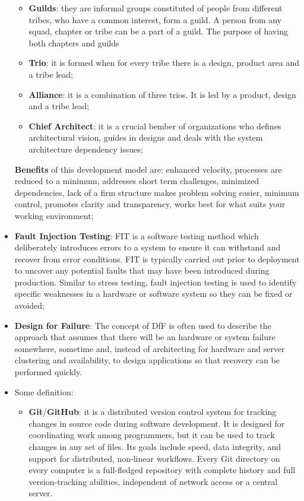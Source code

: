 \documentclass[oneside]{article}
\begin{document}
\begin{itemize}
\begin{itemize}
            \item \textbf{Guilds}: they are informal groups constituted of people from different tribes, who have a common interest, form a guild. A person from any squad, chapter or tribe can be a part of a guild. The purpose of having both chapters and guilds
            
            \item \textbf{Trio}: it is formed when for every tribe there is a design, product area and a tribe lead;
            
            \item \textbf{Alliance}: it is a combination of three trios. It is led by a product, design and a tribe lead;
            
            \item \textbf{Chief Architect}: it is a crucial bember of organizations who defines architectural vision, guides in designs and deals with the system architecture dependency issues;
    \end{itemize}
    
    \textbf{Benefits} of this development model are: enhanced velocity, processes are reduced to a minimum, addresses short term challenges, minimized dependencies, lack of a firm structure makes problem solving easier, minimum control, promotes clarity and transparency, works best for what suits your working environment;
    
    \item \textbf{Fault Injection Testing}: FIT is a software testing method which deliberately introduces errors to a system to ensure it can withstand and recover from error conditions. FIT is typically carried out prior to deployment to uncover any potential faults that may have been introduced during production. Similar to stress testing, fault injection testing is used to identify specific weaknesses in a hardware or software system so they can be fixed or avoided;
    
    \item \textbf{Design for Failure}: The concept of DfF is often used to describe the approach that assumes that there will be an hardware or system failure somewhere, sometime and, instead of architecting for hardware and server clustering and availability, to design applications so that recovery can be performed quickly.
    
    \item Some definition:
        \begin{itemize}
            \item \textbf{Git}/\textbf{GitHub}: it is a distributed version control system for tracking changes in source code during software development. It is designed for coordinating work among programmers, but it can be used to track changes in any set of files. Its goals include speed, data integrity, and support for distributed, non-linear workflows. Every Git directory on every computer is a full-fledged repository with complete history and full version-tracking abilities, independent of network access or a central server.
            

\end{itemize}
\end{itemize}
\end{document}
